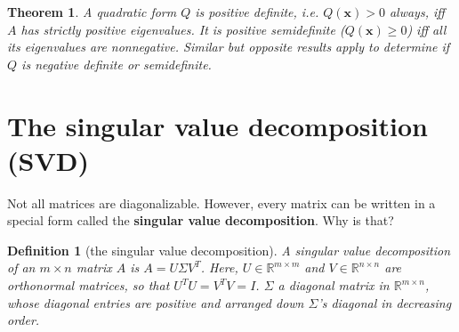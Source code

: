 \documentclass[draft,12pt]{report}
\newtheorem{theorem}{Theorem}
\newtheorem{definition}{Definition}
\renewcommand{\vec}[1]{\mathbf{#1}}
\begin{document}
\begin{theorem}
    A quadratic form $Q$ is positive definite, i.e. $Q(\vec{x}) > 0$ always, iff $A$ has strictly positive eigenvalues. It is positive semidefinite ($Q(\vec{x}) \geq 0$) iff all its eigenvalues are nonnegative. Similar but opposite results apply to determine if $Q$ is negative definite or semidefinite.
\end{theorem}

\section{The singular value decomposition (SVD)}

Not all matrices are diagonalizable. However, every matrix can be written in a special form called the \textbf{singular value decomposition}. Why is that?

\begin{definition}[the singular value decomposition]
    A singular value decomposition of an $m \times n$ matrix $A$ is $A = U\Sigma V^T$. Here, $U \in \mathbb R^{m \times m}$ and $V \in \mathbb R^{n \times n}$ are orthonormal matrices, so that $U^TU = V^TV = I$. $\Sigma$ a diagonal matrix in $\mathbb R^{m \times n}$, whose diagonal entries are positive and arranged down $\Sigma$'s diagonal in decreasing order.
\end{definition}
\end{document}
